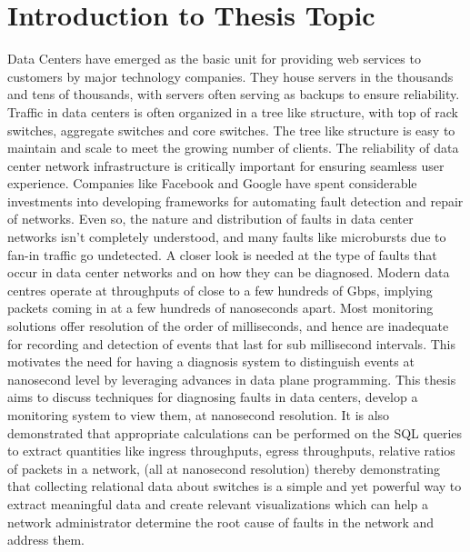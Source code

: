 
\chapter{Introduction to Thesis Topic} %

\label{Chapter1} %



Data Centers have emerged as the basic unit for providing web services to customers by major technology companies.
They house servers in the thousands and tens of thousands, with servers often serving as backups to ensure reliability.
Traffic in data centers is often organized in a tree like structure, with top of rack switches, aggregate switches and core
switches. The tree like structure is easy to maintain and scale to meet the growing number of clients.
\newline
The reliability of data center network infrastructure is critically important for ensuring seamless user experience.
Companies like Facebook\cite{datacenter} and Google\cite{googleOpenflow} have spent considerable investments into developing frameworks for
automating fault detection and repair of networks. Even so, the nature and distribution of faults in data center networks
isn't completely understood, and many faults like microbursts due to fan-in traffic go undetected. A closer look is needed at the type of faults
that occur in data center networks and on how they can be diagnosed.
\newline
Modern data centres operate at throughputs of close to a few hundreds of Gbps, implying packets coming in at a few hundreds of nanoseconds
apart. Most monitoring solutions offer resolution of the order of milliseconds, and hence are inadequate
for recording and detection of events that last for sub millisecond intervals. This motivates the need for
having a diagnosis system to distinguish events at nanosecond level by leveraging advances in data plane programming\cite{dptp}.
\newline
This thesis aims to discuss techniques for diagnosing faults in data centers, develop a monitoring system to view them, 
at nanosecond resolution. It is also demonstrated that appropriate calculations can be performed on the SQL queries
to extract quantities like ingress throughputs, egress throughputs, relative ratios of packets in a network, (all at nanosecond
resolution) thereby demonstrating that collecting relational data about switches is a simple and yet powerful way to extract meaningful 
data and create relevant visualizations\cite{grafana} which can help a network administrator determine the root cause of faults in the network 
and address them.

